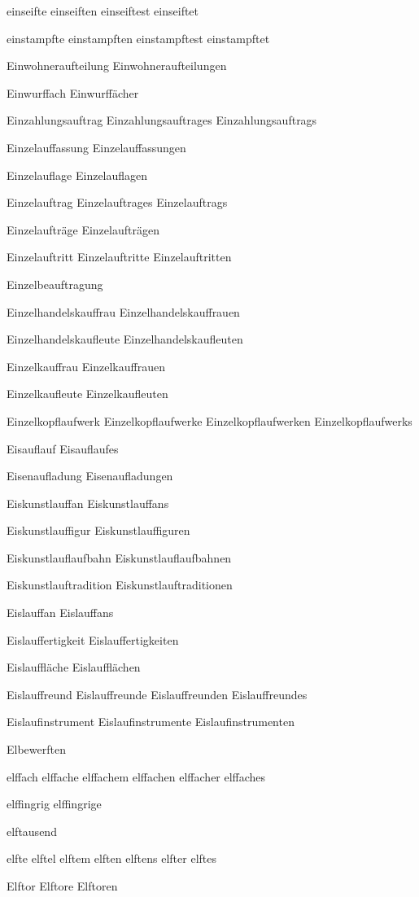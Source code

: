 einseifte
einseiften
einseiftest
einseiftet

einstampfte
einstampften
einstampftest
einstampftet

Einwohneraufteilung
Einwohneraufteilungen

Einwurffach
Einwurffächer

Einzahlungsauftrag
Einzahlungsauftrages
Einzahlungsauftrags

Einzelauffassung
Einzelauffassungen

Einzelauflage
Einzelauflagen

Einzelauftrag
Einzelauftrages
Einzelauftrags

Einzelaufträge
Einzelaufträgen

Einzelauftritt
Einzelauftritte
Einzelauftritten

Einzelbeauftragung

Einzelhandelskauffrau
Einzelhandelskauffrauen

Einzelhandelskaufleute
Einzelhandelskaufleuten

Einzelkauffrau
Einzelkauffrauen

Einzelkaufleute
Einzelkaufleuten

Einzelkopflaufwerk
Einzelkopflaufwerke
Einzelkopflaufwerken
Einzelkopflaufwerks

Eisauflauf
Eisauflaufes

Eisenaufladung
Eisenaufladungen

Eiskunstlauffan
Eiskunstlauffans

Eiskunstlauffigur
Eiskunstlauffiguren

Eiskunstlauflaufbahn
Eiskunstlauflaufbahnen

Eiskunstlauftradition
Eiskunstlauftraditionen

Eislauffan
Eislauffans

Eislauffertigkeit
Eislauffertigkeiten

Eislauffläche
Eislaufflächen

Eislauffreund
Eislauffreunde
Eislauffreunden
Eislauffreundes

Eislaufinstrument
Eislaufinstrumente
Eislaufinstrumenten

Elbewerften

elffach
elffache
elffachem
elffachen
elffacher
elffaches

elffingrig 
elffingrige

elftausend

elfte
elftel
elftem
elften
elftens
elfter
elftes

Elftor
Elftore
Elftoren

